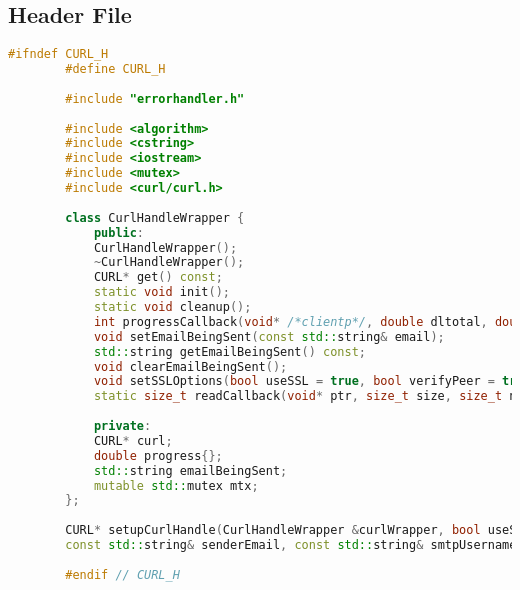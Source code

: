 \documentclass{article}
\begin{document}
	\subsection*{Header File}
	\begin{mdframed}[backgroundcolor=background, hidealllines=false, innerleftmargin=15pt, innerrightmargin=5pt, innertopmargin=0pt, innerbottommargin=-5pt]
	\begin{lstlisting}[language=C++]
		#ifndef CURL_H
		#define CURL_H
		
		#include "errorhandler.h"
		
		#include <algorithm>
		#include <cstring>
		#include <iostream>
		#include <mutex>
		#include <curl/curl.h>
		
		class CurlHandleWrapper {
			public:
			CurlHandleWrapper();
			~CurlHandleWrapper();
			CURL* get() const;
			static void init();
			static void cleanup();
			int progressCallback(void* /*clientp*/, double dltotal, double dlnow, double /*ultotal*/, double /*ulnow*/);
			void setEmailBeingSent(const std::string& email);
			std::string getEmailBeingSent() const;
			void clearEmailBeingSent();
			void setSSLOptions(bool useSSL = true, bool verifyPeer = true, bool verifyHost = true);
			static size_t readCallback(void* ptr, size_t size, size_t nmemb, void* userp);
			
			private:
			CURL* curl;
			double progress{};
			std::string emailBeingSent;
			mutable std::mutex mtx;
		};
		
		CURL* setupCurlHandle(CurlHandleWrapper &curlWrapper, bool useSSL, bool verifyPeer, bool verifyHost, bool verbose,
		const std::string& senderEmail, const std::string& smtpUsername, std::string& mailPassDecrypted, int smtpPort, const std::string& smtpServer);
		
		#endif // CURL_H
	\end{lstlisting}
\end{mdframed}
	
\end{document}
